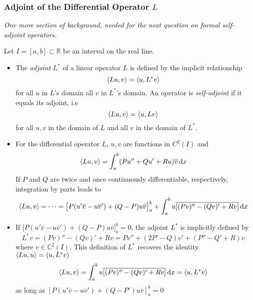 \documentclass[11pt, a4paper]{article}
\newcommand{\question}[1]{\textit{#1}\vspace{2mm}}
\newcommand{\R}{\mathbb{R}} %
\newcommand{\C}{\mathbb{C}} %
\newcommand{\diff}{\mathop{}\!\mathrm{d}} %
\begin{document}
\subsubsection{Adjoint of the Differential Operator $ L $}
\question{One more section of background, needed for the next question on formal self-adjoint operators.}

Let $ I = [a, b] \subset \R $ be an interval on the real line.
\begin{itemize}	
	\item The \textit{adjoint} $ L^* $ of a linear operator $ L $ is defined by the implicit relationship
	\begin{equation*}
		\expval{Lu, v} = \expval{u, L^*v}
	\end{equation*}
	for all $ u $ in $ L $'s domain all $ v $ in $ L^{*} $'s domain. An operator is \textit{self-adjoint} if it equals its adjoint, i.e
	\begin{equation*}
		\expval{Lu, v} = \expval{u, Lv}
	\end{equation*}
	for all $ u, v $ in the domain of $ L $ and all $ v $ in the domain of $ L^* $.

	
	\item For the differential operator $ L $, $ u, v $ are functions in $ C^{2}(I) $ and 
	\begin{equation*}
		\expval{Lu, v} = \int_{a}^{b} (Pu'' + Q u' + R u) \overline{v} \diff x
	\end{equation*}
	If $ P $ and $ Q $ are twice and once continuously differentiable, respectively, integration by parts leads to
	\begin{equation*}
		\expval{Lu, v} = \dots = \big[P(u' \overline{v} - u \overline{v}') + (Q - P)u\overline{v} \big]_{a}^{b} + \int_{a}^{b} u \overline{[(Pv)'' - (Qv)' + Rv]} \diff x
	\end{equation*}
	
	\item If $ \big[P(u' \overline{v} - u \overline{v}') + (Q - P)u\overline{v} \big]_{a}^{b} = 0 $, the adjoint $ L^{*} $ is implicitly defined by
	\begin{equation*}
		L^* v = (Pv)'' - (Qv)' + Rv =Pv'' + (2P' - Q)v' + (P'' - Q' + R)v
	\end{equation*}
	where $ v \in \C^2(I) $. This definition of $ L^{*} $ recovers the identity $ \expval{Lu, u} = \expval{u, L^*v} $
	\begin{equation*}
		\expval{Lu, v} = \int_{a}^{b} u \overline{[(Pv)'' - (Qv)' + Rv]} \diff x = \expval{u, L^*v}
	\end{equation*}
	 as long as $ \left[P(u'\overline{v} - u \overline{v}') + (Q - P')u\overline{v}\right]_{a}^{b} = 0 $
	
\end{itemize}
\end{document}
